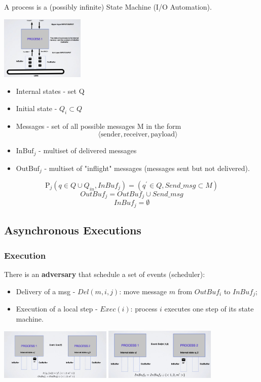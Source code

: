 \documentclass{book}
\begin{document}
A process is a (possibly infinite) State Machine (I/O Automation).
\begin{center}
    \includegraphics[width=0.3\textwidth]{Immagini/2.png}
\end{center}
\begin{itemize}
    \item Internal states - set Q
    \item Initial state - $Q_i \subset Q$
    \item Messages - set of all possible messages M in the form 
    $$\langle \text{sender}, \text{receiver}, \text{payload} \rangle$$
    \item $\text{InBuf}_j$ - multiset of delivered messages
    \item $\text{OutBuf}_j$ - multiset of "inflight" messages (messages sent but not delivered).
\end{itemize}
$$
\text{P}_j\left(q \in Q \cup Q_{in}, InBuf_j\right) = 
\left(q^{'} \in Q, Send\_msg \subset M\right) 
$$
$$
OutBuf_j = OutBuf_j \cup Send\_msg
$$
$$
InBuf_j = \emptyset
$$


\subsection{Asynchronous Executions}


\subsubsection{Execution}
There is an \textbf{adversary} that schedule a set of events (scheduler):
\begin{itemize}
    \item Delivery of a msg - $Del(m, i, j)$: move message $m$ from $OutBuf_i$ to $InBuf_j$;
    \item Execution of a local step - $Exec(i)$: process $i$ executes one step of its state machine.
\end{itemize}

\begin{center}
    \includegraphics[width=0.4\textwidth]{Immagini/3.png}
    \includegraphics[width=0.4\textwidth]{Immagini/4.png}
\end{center}
\end{document}
